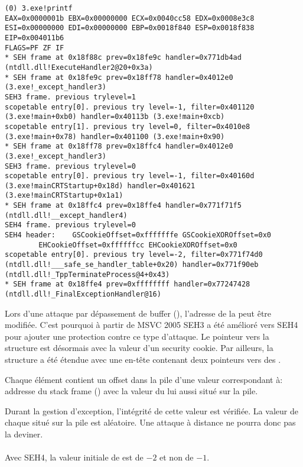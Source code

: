 \begin{lstlisting}[caption=tracer.exe output]
(0) 3.exe!printf
EAX=0x0000001b EBX=0x00000000 ECX=0x0040cc58 EDX=0x0008e3c8
ESI=0x00000000 EDI=0x00000000 EBP=0x0018f840 ESP=0x0018f838
EIP=0x004011b6
FLAGS=PF ZF IF
* SEH frame at 0x18f88c prev=0x18fe9c handler=0x771db4ad (ntdll.dll!ExecuteHandler2@20+0x3a)
* SEH frame at 0x18fe9c prev=0x18ff78 handler=0x4012e0 (3.exe!_except_handler3)
SEH3 frame. previous trylevel=1
scopetable entry[0]. previous try level=-1, filter=0x401120 (3.exe!main+0xb0) handler=0x40113b (3.exe!main+0xcb)
scopetable entry[1]. previous try level=0, filter=0x4010e8 (3.exe!main+0x78) handler=0x401100 (3.exe!main+0x90)
* SEH frame at 0x18ff78 prev=0x18ffc4 handler=0x4012e0 (3.exe!_except_handler3)
SEH3 frame. previous trylevel=0
scopetable entry[0]. previous try level=-1, filter=0x40160d (3.exe!mainCRTStartup+0x18d) handler=0x401621 (3.exe!mainCRTStartup+0x1a1)
* SEH frame at 0x18ffc4 prev=0x18ffe4 handler=0x771f71f5 (ntdll.dll!__except_handler4)
SEH4 frame. previous trylevel=0
SEH4 header:	GSCookieOffset=0xfffffffe GSCookieXOROffset=0x0
		EHCookieOffset=0xffffffcc EHCookieXOROffset=0x0
scopetable entry[0]. previous try level=-2, filter=0x771f74d0 (ntdll.dll!___safe_se_handler_table+0x20) handler=0x771f90eb (ntdll.dll!_TppTerminateProcess@4+0x43)
* SEH frame at 0x18ffe4 prev=0xffffffff handler=0x77247428 (ntdll.dll!_FinalExceptionHandler@16)
\end{lstlisting}


\myindex{\BufferOverflow}
Lors d'une attaque par dépassement de buffer (), l'adresse de la 
 peut être modifiée. C'est pourquoi à partir de MSVC 2005 SEH3 a été amélioré vers 
SEH4 pour ajouter une protection contre ce type d'attaque.
Le pointeur vers la structure  est désormais  avec la valeur 
d'un \gls{security cookie}.
Par ailleurs, la structure  a été étendue avec une en-tête contenant deux pointeurs 
vers des .

Chaque élément contient un offset dans la pile d'une valeur correspondant à: 
addresse du \gls{stack frame} (\EBP)  avec la valeur du  
lui aussi situé sur la pile.

Durant la gestion d'exception, l'intégrité de cette valeur est vérifiée.
La valeur de chaque  situé sur la pile est aléatoire. Une attaque à distance ne 
pourra donc pas la deviner. \\
\\
Avec SEH4, la valeur initiale de  est de $-2$ et non de $-1$.


